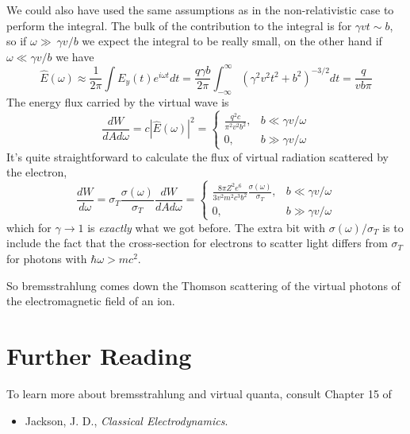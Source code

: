 We could also have used the same assumptions as in the
non-relativistic case to perform the integral.  The bulk of the
contribution to the integral is for $\gamma v t \sim b$, so if $\omega
\gg\ \gamma v/b$ we expect the integral to be really small, on the
other hand if $\omega \ll \gamma v/b$ we have
\begin{equation}
{\hat E}(\omega) \approx \frac{1}{2\pi} \int E_y(t) e^{i\omega t}dt = \frac{q
  \gamma b}{2\pi} \int_{-\infty}^\infty \left ( \gamma^2 v^2 t^2 + b^2
\right )^{-3/2} dt = \frac{q }{v b\pi}
\label{eq:359}
\end{equation}
The energy flux carried by the virtual wave is
\begin{equation}
\frac{dW}{dAd\omega} = c |{\hat E}(\omega)|^2 =
\left \{
\begin{array}{cl}
\frac{ q^2 c}{\pi^2 v^2 b^2}, & b \ll \gamma v/\omega \\
 0, & b \gg \gamma v/\omega
\end{array}
\right .
\label{eq:360}
\end{equation}
It's quite straightforward to calculate the flux of virtual radiation scattered
by the electron,
\begin{equation}
\frac{dW}{d\omega} = \sigma_T \frac{\sigma(\omega)}{\sigma_T} \frac{dW}{dAd\omega} = 
\left \{
\begin{array}{cl}
\frac{ 8 \pi Z^2 e^6}{3 v^2 m^2 c^3 b^2} \frac{\sigma(\omega)}{\sigma_T}, & b \ll \gamma v/\omega \\
 0, & b \gg \gamma v/\omega
\end{array}
\right .
\label{eq:361}
\end{equation}
which for $\gamma\rightarrow 1$ is {\em exactly} what we got before.
The extra bit with $\sigma(\omega)/\sigma_T$ is to include the fact
that the cross-section for electrons to scatter light differs from
$\sigma_T$ for photons with $\hbar \omega > mc^2$.

So bremsstrahlung comes down the Thomson scattering of the virtual
photons of the electromagnetic field of an ion.

\section{Further Reading}

To learn more about bremsstrahlung and virtual quanta, consult Chapter 15
of
\begin{itemize}
\item Jackson, J. D., {\em Classical Electrodynamics}.
\end{itemize}

